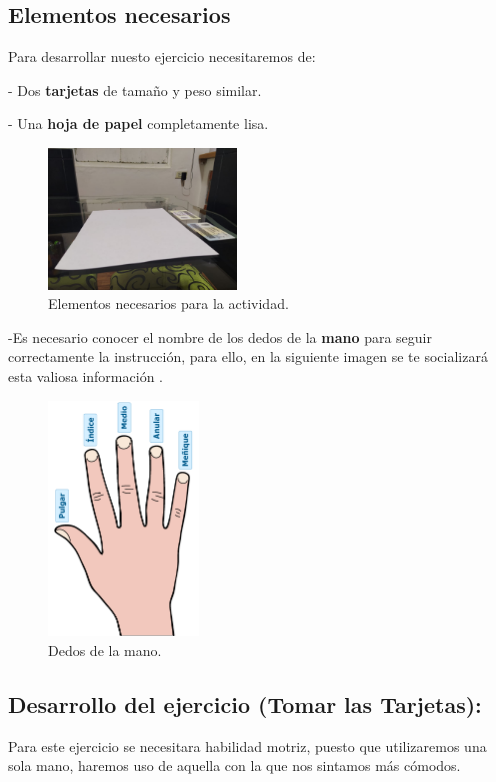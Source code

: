 \documentclass{article}
\begin{document}
\subsection{Elementos necesarios}
Para desarrollar nuesto ejercicio necesitaremos de:
\newline 

- Dos \textbf{tarjetas} de tamaño y peso similar.
\newline

- Una \textbf{hoja de papel} completamente lisa.
\begin{figure}[h]
\includegraphics[width=5cm]{elementos.jpeg}
\centering
\caption{Elementos necesarios para la actividad.}
\label{fig:elementos}
\end{figure}
\newline

-Es necesario conocer el nombre de los dedos de la \textbf{mano} para seguir correctamente la instrucción, para ello, en la siguiente imagen se te socializará esta valiosa información \cite{dedosmano}.
\newpage
\begin{figure}[h]
\includegraphics[width=4cm]{nombre_dedos_mano (1).png}
\centering
\caption{Dedos de la mano.}
\label{fig:fingers}
\end{figure}
\subsection{Desarrollo del ejercicio (Tomar las Tarjetas): }
Para este ejercicio se necesitara habilidad motriz, puesto que utilizaremos una sola mano, haremos uso de aquella con 
la que nos sintamos más cómodos.
\newline
\end{document}
